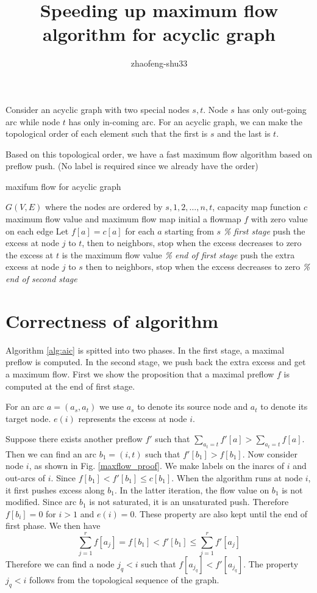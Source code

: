 \documentclass{article}
\title{Speeding up maximum flow algorithm for acyclic graph}
\author{zhaofeng-shu33}
\theoremstyle{definition}
\begin{document}
\maketitle
Consider an acyclic graph with two special nodes $s, t$. Node $s$ has only out-going arc while node $t$ has only in-coming arc.
For an acyclic graph, we can make the topological order of each element such that the first is $s$ and the last is $t$.

Based on this topological order, we have a fast maximum flow algorithm based on preflow push. (No label is required since we already have the order)
\begin{algorithm}
\caption{maxifum flow for acyclic graph}\label{alg:aic}
	\begin{algorithmic}[1]
		\REQUIRE $G(V,E)$ where the nodes are ordered by $s, 1, 2, \dots, n, t$, capacity map function $c$
		\ENSURE maximum flow value and maximum flow map
		\STATE initial a flowmap $f$ with zero value on each edge
		\STATE Let $f[a] = c[a]$ for each $a$ starting from $s$  \textit{\% first stage}
			\STATE push the excess at node $j$ to $t$, then to neighbors, stop when the excess decreases to zero
		\ENDFOR
	      \STATE the excess at $t$ is the maximum flow value \textit{\% end of first stage}
			\STATE push the extra excess at node $j$ to $s$ then to neighbors, stop when the excess decreases to zero
		\ENDFOR  \textit{\% end of second stage}
           
	\end{algorithmic}
\end{algorithm}
\section{Correctness of algorithm}
Algorithm \ref{alg:aic} is spitted into two phases. In the first stage, a maximal preflow is computed. In the second stage, we push back the extra excess and get a maximum flow.  
First we show the proposition that a maximal preflow $f$ is computed at the end of first stage.

For an arc $a = (a_s, a_t)$ we use $a_s$ to denote its source node and $a_t$ to denote its target node. $e(i)$ represents the excess at node $i$.

Suppose there exists another preflow $f'$ such that $\sum_{a_t = t} f'[a] > \sum_{a_t =t} f[a]$. Then we can find an arc $b_1 = (i, t)$ such that $f'[b_1] > f[b_1]$. Now consider node $i$, as shown in Fig. \ref{maxflow_proof}. We make labels on the inarcs of $i$ and out-arcs of $i$.
Since $f[b_1] < f'[b_1] \leq c[b_1]$. When the algorithm runs at node $i$, it first pushes excess along $b_1$. In the latter iteration, the flow value on $b_1$ is not modified. Since arc $b_1$ is not saturated, it is an unsaturated push. Therefore $f[b_i] = 0$ for $i>1$ and $e(i) = 0$. These property are also kept until the end of first phase.  We then have
\begin{equation}
\sum_{j=1}^r f[a_j] = f[b_1] < f'[b_1] \leq \sum_{j=1}^r f'[a_j]
\end{equation}
Therefore we can find a node $j_q<i$ such that $f[a_{j_q}] < f'[a_{j_q}]$. The property ${j_q}<i$ follows from the topological sequence of the graph.
\end{document}
